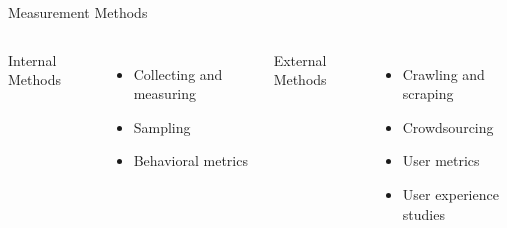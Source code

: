 \documentclass[nobackground,dvipsnames,table]{beamer}
\begin{document}
\begin{frame}{Measurement Methods}
    \begin{columns}[T]
            Internal Methods \\ %
            \begin{itemize}
                \item Collecting and measuring \\
                \item Sampling \\
                \item Behavioral metrics \\
            \end{itemize}
            External Methods \\ %
            \begin{itemize}
                \item Crawling and scraping \\
                \item Crowdsourcing \\
                \item User metrics \\
                \item User experience studies \\
            \end{itemize}
    \end{columns}
\end{frame}

\begin{frame}{} %
    \thispagestyle{empty}
\end{frame}
\end{document}
